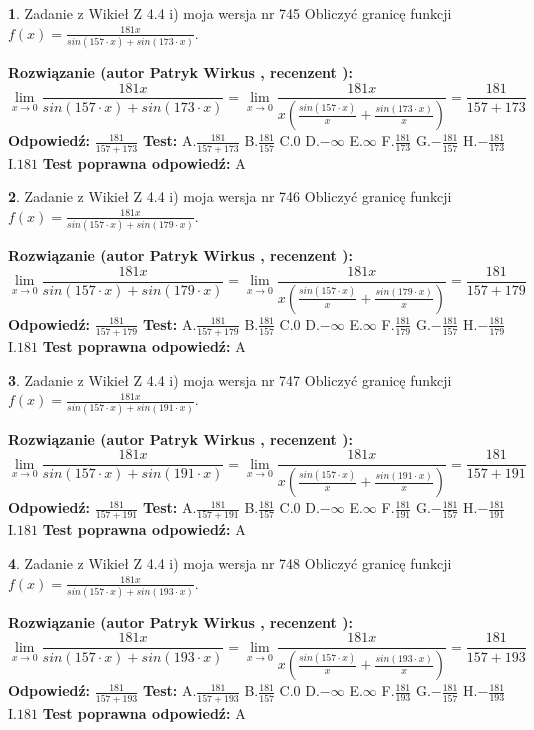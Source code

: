 \documentclass[12pt, a4paper]{article}
\theoremstyle{definition} %
\newtheorem{zad}{}
\newcommand{\zadStart}[1]{\begin{zad}#1\newline}
\newcommand{\zadStop}{\end{zad}}
\newcommand{\rozwStart}[2]{\noindent \textbf{Rozwiązanie (autor #1 , recenzent #2): }\newline}
\newcommand{\rozwStop}{\newline}
\newcommand{\odpStart}{\noindent \textbf{Odpowiedź:}\newline}
\newcommand{\odpStop}{\newline}
\newcommand{\testStart}{\noindent \textbf{Test:}\newline}
\newcommand{\testStop}{\newline}
\newcommand{\kluczStart}{\noindent \textbf{Test poprawna odpowiedź:}\newline}
\newcommand{\kluczStop}{\newline}
\begin{document}
\zadStart{Zadanie z Wikieł Z 4.4 i) moja wersja nr 745}
Obliczyć granicę funkcji $f(x)=\frac{181x}{sin(157\cdot x) +sin(173\cdot x)}$.
\zadStop
\rozwStart{Patryk Wirkus}{}
$$\lim\limits_{x\to 0}\frac{181x}{sin(157\cdot x) +sin(173\cdot x)}=\lim\limits_{x\to 0}\frac{181x}{x(\frac{sin(157\cdot x)}{x}+\frac{sin(173\cdot x)}{x})}=\frac{181}{157+173}$$
\rozwStop
\odpStart
$\frac{181}{157+173}$
\odpStop
\testStart
A.$\frac{181}{157+173}$
B.$\frac{181}{157}$
C.$0$
D.$-\infty$
E.$\infty$
F.$\frac{181}{173}$
G.$-\frac{181}{157}$
H.$-\frac{181}{173}$
I.$181$
\testStop
\kluczStart
A
\kluczStop



\zadStart{Zadanie z Wikieł Z 4.4 i) moja wersja nr 746}
Obliczyć granicę funkcji $f(x)=\frac{181x}{sin(157\cdot x) +sin(179\cdot x)}$.
\zadStop
\rozwStart{Patryk Wirkus}{}
$$\lim\limits_{x\to 0}\frac{181x}{sin(157\cdot x) +sin(179\cdot x)}=\lim\limits_{x\to 0}\frac{181x}{x(\frac{sin(157\cdot x)}{x}+\frac{sin(179\cdot x)}{x})}=\frac{181}{157+179}$$
\rozwStop
\odpStart
$\frac{181}{157+179}$
\odpStop
\testStart
A.$\frac{181}{157+179}$
B.$\frac{181}{157}$
C.$0$
D.$-\infty$
E.$\infty$
F.$\frac{181}{179}$
G.$-\frac{181}{157}$
H.$-\frac{181}{179}$
I.$181$
\testStop
\kluczStart
A
\kluczStop



\zadStart{Zadanie z Wikieł Z 4.4 i) moja wersja nr 747}
Obliczyć granicę funkcji $f(x)=\frac{181x}{sin(157\cdot x) +sin(191\cdot x)}$.
\zadStop
\rozwStart{Patryk Wirkus}{}
$$\lim\limits_{x\to 0}\frac{181x}{sin(157\cdot x) +sin(191\cdot x)}=\lim\limits_{x\to 0}\frac{181x}{x(\frac{sin(157\cdot x)}{x}+\frac{sin(191\cdot x)}{x})}=\frac{181}{157+191}$$
\rozwStop
\odpStart
$\frac{181}{157+191}$
\odpStop
\testStart
A.$\frac{181}{157+191}$
B.$\frac{181}{157}$
C.$0$
D.$-\infty$
E.$\infty$
F.$\frac{181}{191}$
G.$-\frac{181}{157}$
H.$-\frac{181}{191}$
I.$181$
\testStop
\kluczStart
A
\kluczStop



\zadStart{Zadanie z Wikieł Z 4.4 i) moja wersja nr 748}
Obliczyć granicę funkcji $f(x)=\frac{181x}{sin(157\cdot x) +sin(193\cdot x)}$.
\zadStop
\rozwStart{Patryk Wirkus}{}
$$\lim\limits_{x\to 0}\frac{181x}{sin(157\cdot x) +sin(193\cdot x)}=\lim\limits_{x\to 0}\frac{181x}{x(\frac{sin(157\cdot x)}{x}+\frac{sin(193\cdot x)}{x})}=\frac{181}{157+193}$$
\rozwStop
\odpStart
$\frac{181}{157+193}$
\odpStop
\testStart
A.$\frac{181}{157+193}$
B.$\frac{181}{157}$
C.$0$
D.$-\infty$
E.$\infty$
F.$\frac{181}{193}$
G.$-\frac{181}{157}$
H.$-\frac{181}{193}$
I.$181$
\testStop
\kluczStart
A
\kluczStop
\end{document}
